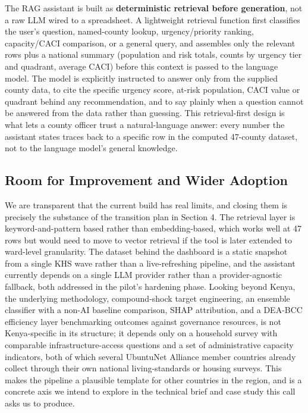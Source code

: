 \documentclass[12pt,a4paper]{article}
\begin{document}
The RAG assistant is built as \textbf{deterministic retrieval before generation}, not a raw LLM wired to a spreadsheet. A lightweight retrieval function first classifies the user's question, named-county lookup, urgency/priority ranking, capacity/CACI comparison, or a general query, and assembles only the relevant rows plus a national summary (population and risk totals, counts by urgency tier and quadrant, average CACI) before this context is passed to the language model. The model is explicitly instructed to answer only from the supplied county data, to cite the specific urgency score, at-risk population, CACI value or quadrant behind any recommendation, and to say plainly when a question cannot be answered from the data rather than guessing. This retrieval-first design is what lets a county officer trust a natural-language answer: every number the assistant states traces back to a specific row in the computed 47-county dataset, not to the language model's general knowledge.

\subsection{Room for Improvement and Wider Adoption}
We are transparent that the current build has real limits, and closing them is precisely the substance of the transition plan in Section 4. The retrieval layer is keyword-and-pattern based rather than embedding-based, which works well at 47 rows but would need to move to vector retrieval if the tool is later extended to ward-level granularity. The dataset behind the dashboard is a static snapshot from a single KHS wave rather than a live-refreshing pipeline, and the assistant currently depends on a single LLM provider rather than a provider-agnostic fallback, both addressed in the pilot's hardening phase. Looking beyond Kenya, the underlying methodology, compound-shock target engineering, an ensemble classifier with a non-AI baseline comparison, SHAP attribution, and a DEA-BCC efficiency layer benchmarking outcomes against governance resources, is not Kenya-specific in its structure; it depends only on a household survey with comparable infrastructure-access questions and a set of administrative capacity indicators, both of which several UbuntuNet Alliance member countries already collect through their own national living-standards or housing surveys. This makes the pipeline a plausible template for other countries in the region, and is a concrete axis we intend to explore in the technical brief and case study this call asks us to produce.
\end{document}
